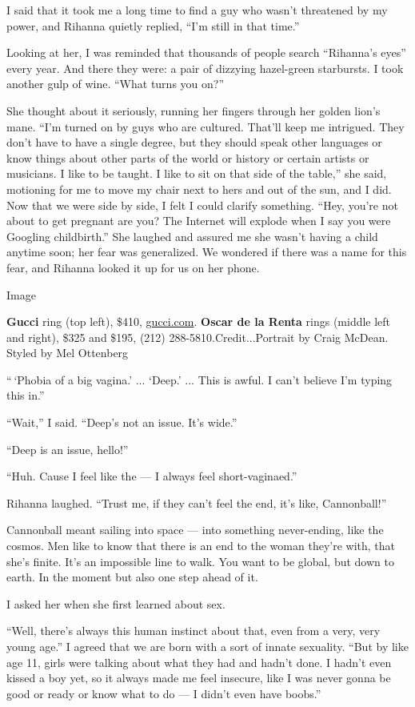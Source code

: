 I said that it took me a long time to find a guy who wasn't threatened
by my power, and Rihanna quietly replied, ``I'm still in that time.''

Looking at her, I was reminded that thousands of people search
``Rihanna's eyes'' every year. And there they were: a pair of dizzying
hazel-green starbursts. I took another gulp of wine. ``What turns you
on?''

She thought about it seriously, running her fingers through her golden
lion's mane. ``I'm turned on by guys who are cultured. That'll keep me
intrigued. They don't have to have a single degree, but they should
speak other languages or know things about other parts of the world or
history or certain artists or musicians. I like to be taught. I like to
sit on that side of the table,'' she said, motioning for me to move my
chair next to hers and out of the sun, and I did. Now that we were side
by side, I felt I could clarify something. ``Hey, you're not about to
get pregnant are you? The Internet will explode when I say you were
Googling childbirth.'' She laughed and assured me she wasn't having a
child anytime soon; her fear was generalized. We wondered if there was a
name for this fear, and Rihanna looked it up for us on her phone.

Image

\textbf{Gucci} ring (top left), \$410,
\href{http://www.gucci.com}{gucci.com}. \textbf{Oscar de la Renta} rings
(middle left and right), \$325 and \$195, (212)
288-5810.Credit...Portrait by Craig McDean. Styled by Mel Ottenberg

`` `Phobia of a big vagina.' ... `Deep.' ... This is awful. I can't
believe I'm typing this in.''

``Wait,'' I said. ``Deep's not an issue. It's wide.''

``Deep is an issue, hello!''

``Huh. Cause I feel like the --- I always feel short-vaginaed.''

Rihanna laughed. ``Trust me, if they can't feel the end, it's like,
Cannonball!''

Cannonball meant sailing into space --- into something never-ending,
like the cosmos. Men like to know that there is an end to the woman
they're with, that she's finite. It's an impossible line to walk. You
want to be global, but down to earth. In the moment but also one step
ahead of it.

I asked her when she first learned about sex.

``Well, there's always this human instinct about that, even from a very,
very young age.'' I agreed that we are born with a sort of innate
sexuality. ``But by like age 11, girls were talking about what they had
and hadn't done. I hadn't even kissed a boy yet, so it always made me
feel insecure, like I was never gonna be good or ready or know what to
do --- I didn't even have boobs.''

